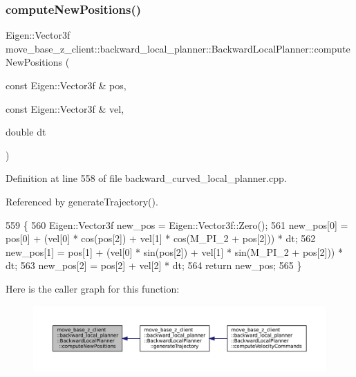 \subsubsection{\texorpdfstring{compute\+New\+Positions()}{computeNewPositions()}}
{\footnotesize\ttfamily Eigen\+::\+Vector3f move\+\_\+base\+\_\+z\+\_\+client\+::backward\+\_\+local\+\_\+planner\+::\+Backward\+Local\+Planner\+::compute\+New\+Positions (\begin{DoxyParamCaption}\item[{const Eigen\+::\+Vector3f \&}]{pos,  }\item[{const Eigen\+::\+Vector3f \&}]{vel,  }\item[{double}]{dt }\end{DoxyParamCaption})\hspace{0.3cm}{\ttfamily [private]}}



Definition at line 558 of file backward\+\_\+curved\+\_\+local\+\_\+planner.\+cpp.



Referenced by generate\+Trajectory().


\begin{DoxyCode}
559 \{
560     Eigen::Vector3f new\_pos = Eigen::Vector3f::Zero();
561     new\_pos[0] = pos[0] + (vel[0] * cos(pos[2]) + vel[1] * cos(M\_PI\_2 + pos[2])) * dt;
562     new\_pos[1] = pos[1] + (vel[0] * sin(pos[2]) + vel[1] * sin(M\_PI\_2 + pos[2])) * dt;
563     new\_pos[2] = pos[2] + vel[2] * dt;
564     \textcolor{keywordflow}{return} new\_pos;
565 \}
\end{DoxyCode}
Here is the caller graph for this function\+:
\nopagebreak
\begin{figure}[H]
\begin{center}
\leavevmode
\includegraphics[width=350pt]{classmove__base__z__client_1_1backward__local__planner_1_1BackwardLocalPlanner_af91f457b97d26abf9b9e2cfcbeb9d7ed_icgraph}
\end{center}
\end{figure}
\mbox{\label{classmove__base__z__client_1_1backward__local__planner_1_1BackwardLocalPlanner_a8e7dec0bc31856d814d8fa6df747bbb8}} 
